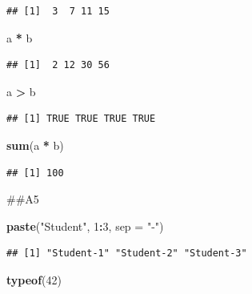 \documentclass[
]{article}
\newenvironment{Shaded}{\begin{snugshade}}{\end{snugshade}}
\newcommand{\AttributeTok}[1]{\textcolor[rgb]{0.13,0.29,0.53}{#1}}
\newcommand{\DecValTok}[1]{\textcolor[rgb]{0.00,0.00,0.81}{#1}}
\newcommand{\FunctionTok}[1]{\textcolor[rgb]{0.13,0.29,0.53}{\textbf{#1}}}
\newcommand{\NormalTok}[1]{#1}
\newcommand{\SpecialCharTok}[1]{\textcolor[rgb]{0.81,0.36,0.00}{\textbf{#1}}}
\newcommand{\StringTok}[1]{\textcolor[rgb]{0.31,0.60,0.02}{#1}}
\begin{document}
\begin{verbatim}
## [1]  3  7 11 15
\end{verbatim}

\begin{Shaded}
\begin{Highlighting}[]
\NormalTok{a }\SpecialCharTok{*}\NormalTok{ b}
\end{Highlighting}
\end{Shaded}

\begin{verbatim}
## [1]  2 12 30 56
\end{verbatim}

\begin{Shaded}
\begin{Highlighting}[]
\NormalTok{a }\SpecialCharTok{\textgreater{}}\NormalTok{ b}
\end{Highlighting}
\end{Shaded}

\begin{verbatim}
## [1] TRUE TRUE TRUE TRUE
\end{verbatim}

\begin{Shaded}
\begin{Highlighting}[]
\FunctionTok{sum}\NormalTok{(a }\SpecialCharTok{*}\NormalTok{ b)}
\end{Highlighting}
\end{Shaded}

\begin{verbatim}
## [1] 100
\end{verbatim}

\#\#A5

\begin{Shaded}
\begin{Highlighting}[]
\FunctionTok{paste}\NormalTok{(}\StringTok{"Student"}\NormalTok{, }\DecValTok{1}\SpecialCharTok{:}\DecValTok{3}\NormalTok{, }\AttributeTok{sep =} \StringTok{"{-}"}\NormalTok{)}
\end{Highlighting}
\end{Shaded}

\begin{verbatim}
## [1] "Student-1" "Student-2" "Student-3"
\end{verbatim}

\begin{Shaded}
\begin{Highlighting}[]
\FunctionTok{typeof}\NormalTok{(}\DecValTok{42}\NormalTok{)}
\end{Highlighting}
\end{Shaded}
\end{document}
